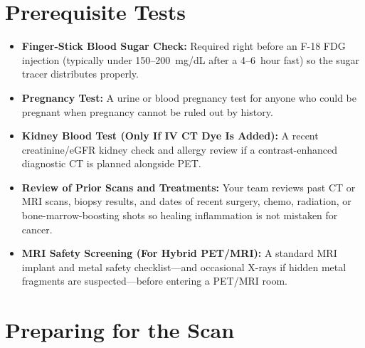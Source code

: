 \section{Prerequisite Tests}

\begin{itemize}
    \item \textbf{Finger-Stick Blood Sugar Check:} Required right before an F-18 FDG injection (typically under 150--200~mg/dL after a 4--6~hour fast) so the sugar tracer distributes properly.
    \item \textbf{Pregnancy Test:} A urine or blood pregnancy test for anyone who could be pregnant when pregnancy cannot be ruled out by history.
    \item \textbf{Kidney Blood Test (Only If IV CT Dye Is Added):} A recent creatinine/eGFR kidney check and allergy review if a contrast-enhanced diagnostic CT is planned alongside PET.
    \item \textbf{Review of Prior Scans and Treatments:} Your team reviews past CT or MRI scans, biopsy results, and dates of recent surgery, chemo, radiation, or bone-marrow-boosting shots so healing inflammation is not mistaken for cancer.
    \item \textbf{MRI Safety Screening (For Hybrid PET/MRI):} A standard MRI implant and metal safety checklist---and occasional X-rays if hidden metal fragments are suspected---before entering a PET/MRI room.
\end{itemize}

\section{Preparing for the Scan}

